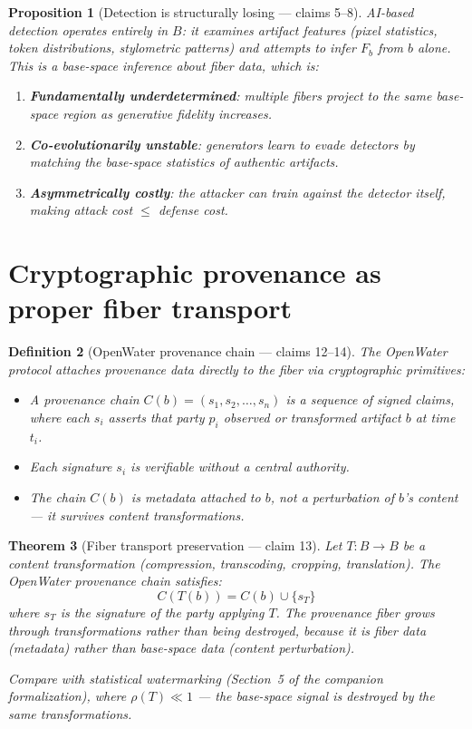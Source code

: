 \documentclass[11pt,a4paper]{article}
\newtheorem{definition}{Definition}[section]
\newtheorem{theorem}[definition]{Theorem}
\newtheorem{proposition}[definition]{Proposition}
\begin{document}
\begin{proposition}[Detection is structurally losing --- claims 5--8]
\label{prop:detection-losing}
AI-based detection operates entirely in $B$: it examines artifact features
(pixel statistics, token distributions, stylometric patterns) and attempts
to infer $F_b$ from $b$ alone. This is a base-space inference about
fiber data, which is:
\begin{enumerate}
\item \textbf{Fundamentally underdetermined}: multiple fibers project to
  the same base-space region as generative fidelity increases.
\item \textbf{Co-evolutionarily unstable}: generators learn to evade
  detectors by matching the base-space statistics of authentic artifacts.
\item \textbf{Asymmetrically costly}: the attacker can train against the
  detector itself, making attack cost $\leq$ defense cost.
\end{enumerate}
\end{proposition}

\section{Cryptographic provenance as proper fiber transport}
\label{sec:openwater}

\begin{definition}[OpenWater provenance chain --- claims 12--14]
\label{def:openwater}
The OpenWater protocol attaches provenance data directly to the fiber
via cryptographic primitives:
\begin{itemize}
\item A \emph{provenance chain} $C(b) = (s_1, s_2, \ldots, s_n)$ is a
  sequence of signed claims, where each $s_i$ asserts that party $p_i$
  observed or transformed artifact $b$ at time $t_i$.
\item Each signature $s_i$ is verifiable without a central authority.
\item The chain $C(b)$ is metadata attached to $b$, not a perturbation
  of $b$'s content --- it survives content transformations.
\end{itemize}
\end{definition}

\begin{theorem}[Fiber transport preservation --- claim 13]
\label{thm:transport}
Let $T : B \to B$ be a content transformation (compression, transcoding,
cropping, translation). The OpenWater provenance chain satisfies:
\[
  C(T(b)) = C(b) \cup \{s_{T}\}
\]
where $s_T$ is the signature of the party applying $T$. The provenance
fiber \emph{grows} through transformations rather than being destroyed,
because it is fiber data (metadata) rather than base-space data
(content perturbation).

Compare with statistical watermarking (Section~5 of the companion
formalization), where $\rho(T) \ll 1$ --- the base-space signal is
destroyed by the same transformations.
\end{theorem}
\end{document}
